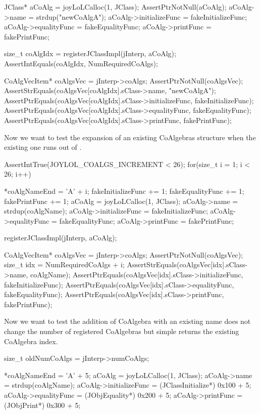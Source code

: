   JClass* aCoAlg   = joyLoLCalloc(1, JClass);
  AssertPtrNotNull(aCoAlg);
  aCoAlg->name           = strdup("newCoAlgA");
  aCoAlg->initializeFunc = fakeInitializeFunc;
  aCoAlg->equalityFunc   = fakeEqualityFunc;
  aCoAlg->printFunc      = fakePrintFunc;

  size_t coAlgIdx = registerJClassImpl(jInterp, aCoAlg);
  AssertIntEquals(coAlgIdx, NumRequiredCoAlgs);

  CoAlgVecItem* coAlgsVec = jInterp->coAlgs;
  AssertPtrNotNull(coAlgsVec);
  AssertStrEquals(coAlgsVec[coAlgIdx].sClass->name, "newCoAlgA");
  AssertPtrEquals(coAlgsVec[coAlgIdx].sClass->initializeFunc, fakeInitializeFunc);
  AssertPtrEquals(coAlgsVec[coAlgIdx].sClass->equalityFunc, fakeEqualityFunc);
  AssertPtrEquals(coAlgsVec[coAlgIdx].sClass->printFunc,    fakePrintFunc);
\stopCTest

Now we want to test the expansion of an existing CoAlgebras structure when 
the existing one runs out of . 

\startCTest
  AssertIntTrue(JOYLOL_COALGS_INCREMENT < 26);
  for(size_t i = 1; i < 26; i++) {
    *coAlgNameEnd          = 'A' + i;
    fakeInitializeFunc    += 1;
    fakeEqualityFunc      += 1;
    fakePrintFunc         += 1;
    aCoAlg                 = joyLoLCalloc(1, JClass);
    aCoAlg->name           = strdup(coAlgName);
    aCoAlg->initializeFunc = fakeInitializeFunc;
    aCoAlg->equalityFunc   = fakeEqualityFunc;
    aCoAlg->printFunc      = fakePrintFunc;

    registerJClassImpl(jInterp, aCoAlg);

    CoAlgVecItem* coAlgsVec = jInterp->coAlgs;
    AssertPtrNotNull(coAlgsVec);
    size_t idx = NumRequiredCoAlgs + i;
    AssertStrEquals(coAlgsVec[idx].sClass->name, coAlgName);
    AssertPtrEquals(coAlgsVec[idx].sClass->initializeFunc, fakeInitializeFunc);
    AssertPtrEquals(coAlgsVec[idx].sClass->equalityFunc, fakeEqualityFunc);
    AssertPtrEquals(coAlgsVec[idx].sClass->printFunc,    fakePrintFunc);
  }
\stopCTest

Now we want to test the addition of CoAlgebra with an existing name does 
not change the number of registered CoAlgebras but simple returns the 
existing CoAlgebra index. 

\startCTest
  size_t oldNumCoAlgs  = jInterp->numCoAlgs;

  *coAlgNameEnd          = 'A' + 5;
  aCoAlg                 = joyLoLCalloc(1, JClass);
  aCoAlg->name           = strdup(coAlgName);
  aCoAlg->initializeFunc = (JClassInitialize*) 0x100 + 5;
  aCoAlg->equalityFunc   = (JObjEquality*)     0x200 + 5;
  aCoAlg->printFunc      = (JObjPrint*)        0x300 + 5;
  
